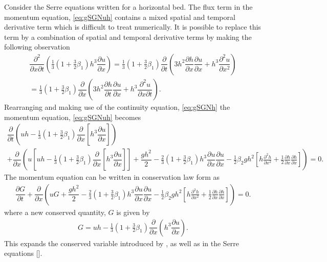\documentclass[10pt]{article}
\begin{document}
Consider the Serre equations written for a horizontal bed. The flux term in the momentum equation, \eqref{eq:gSGNuh} contains a mixed spatial and temporal derivative term which is difficult to treat numerically. It is possible to replace this term  by a combination of spatial and temporal derivative terms by making the following observation
\begin{multline}
\dfrac{\partial^2}{\partial x \partial t} \left ( \frac{1}{3}\left(1 + \frac{3}{2} \beta_1\right) h^3 \dfrac{\partial u}{\partial x} \right ) =   \frac{1}{3}\left(1 + \frac{3}{2} \beta_1\right) \dfrac{\partial }{\partial t} \left ( 3h^2 \dfrac{\partial h}{\partial x} \dfrac{\partial u}{\partial x} + h^3 \dfrac{\partial^2 u}{\partial x^2} \right ) \\=  \frac{1}{3}\left(1 + \frac{3}{2} \beta_1\right)
\dfrac{\partial }{\partial x} \left ( 3 h^2 \dfrac{\partial h}{\partial t} \dfrac{\partial u}{\partial x} + h^3 \dfrac{\partial^2 u}{\partial x \partial t} \right ).
\end{multline}
Rearranging and making use of the continuity equation, \eqref{eq:gSGNh} the momentum equation, \eqref{eq:gSGNuh} becomes
\begin{multline}
\dfrac{\partial }{\partial t} \left ( u h -  \frac{1}{3}\left(1 + \frac{3}{2} \beta_1\right) \dfrac{\partial}{\partial x} \left [h^3 \dfrac{\partial u}{\partial x}  \right ] \right ) \\ + \dfrac{\partial}{\partial x} \left ( u\left[uh - \frac{1}{3}\left(1 + \frac{3}{2} \beta_1\right) \dfrac{\partial }{\partial x} \left [ h^3 \dfrac{\partial u}{\partial x} \right ]\right] + \dfrac{gh^2}{2} - \frac{2}{3}\left(1 + \frac{3}{2} \beta_1\right) h^3\dfrac{\partial u}{\partial x}\dfrac{\partial u}{\partial x}  - \frac{1}{2} \beta_2 g h^2 \left[h\frac{\partial^2 h}{\partial x^2} + \frac{1}{2}\frac{\partial h}{\partial x}\frac{\partial h}{\partial x}\right]\right ) = 0.
\end{multline}
The momentum equation can be written in conservation law form as
\begin{gather}\label{eq:G_momentum}
\dfrac{\partial G }{\partial t}  + \dfrac{\partial}{\partial x} \left ( uG + \dfrac{gh^2}{2} - \frac{2}{3}\left(1 + \frac{3}{2} \beta_1\right) h^3\dfrac{\partial u}{\partial x}\dfrac{\partial u}{\partial x}  - \frac{1}{2} \beta_2 g h^2  \left[h\frac{\partial^2 h}{\partial x^2} + \frac{1}{2}\frac{\partial h}{\partial x}\frac{\partial h}{\partial x}\right]\right ) = 0.
\end{gather}
where a new conserved quantity, $G$ is given by
\begin{gather*}
G = uh - \frac{1}{3}\left(1 + \frac{3}{2} \beta_1\right) \dfrac{\partial }{\partial x} \left ( h^3 \dfrac{\partial u}{\partial x} \right ).
\end{gather*}
This expands the conserved variable introduced by \cite{Clamond-Dutykh-2018-237}, as well as in the Serre equations []. 
\end{document}

